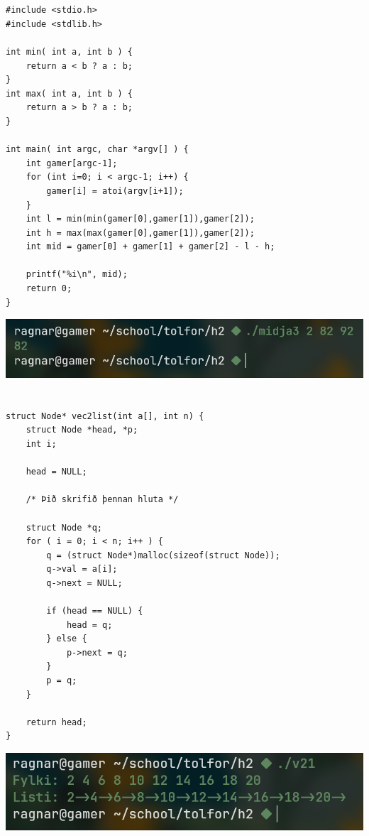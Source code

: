\documentclass{article}
\begin{document}
	\section{}
	\begin{verbatim}
#include <stdio.h>
#include <stdlib.h>

int min( int a, int b ) {
	return a < b ? a : b;
}
int max( int a, int b ) {
	return a > b ? a : b;
}

int main( int argc, char *argv[] ) {
	int gamer[argc-1];
	for (int i=0; i < argc-1; i++) {
		gamer[i] = atoi(argv[i+1]);
	}
	int l = min(min(gamer[0],gamer[1]),gamer[2]);
	int h = max(max(gamer[0],gamer[1]),gamer[2]);
	int mid = gamer[0] + gamer[1] + gamer[2] - l - h;

	printf("%i\n", mid);
	return 0;
}
	\end{verbatim}
	\includegraphics[scale=0.275]{mid.png}
	\section{}
	\begin{verbatim}
struct Node* vec2list(int a[], int n) {
    struct Node *head, *p;
    int i;
    
    head = NULL;

    /* Þið skrifið þennan hluta */

	struct Node *q;
	for ( i = 0; i < n; i++ ) {
		q = (struct Node*)malloc(sizeof(struct Node));
		q->val = a[i];
		q->next = NULL;

		if (head == NULL) {
			head = q;
		} else {
			p->next = q;
		}
		p = q;
	}
    
    return head;
}

	\end{verbatim}
	\includegraphics[scale=0.275]{linked.png}
	
\end{document}
